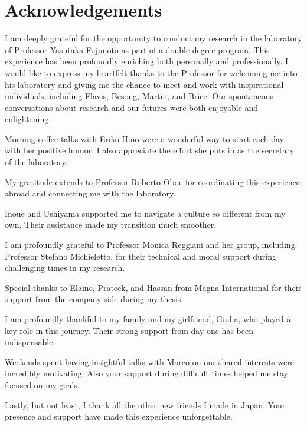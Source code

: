 \thispagestyle{empty}
\section*{Acknowledgements}
\vspace{0.5cm}
I am deeply grateful for the opportunity to conduct my research in the laboratory 
of Professor Yasutaka Fujimoto as part of a double-degree program. This experience 
has been profoundly enriching both personally and professionally. I would like 
to express my heartfelt thanks to the Professor for welcoming me into his laboratory and 
giving me the chance to meet and work with inspirational individuals, including 
Flavis, Besong, Martin, and Brice. Our spontaneous conversations about research 
and our futures were both enjoyable and enlightening.

Morning coffee talks with Eriko Hino were a wonderful way to start each day with 
her positive humor. I also appreciate the effort she puts in as the secretary of 
the laboratory.

My gratitude extends to Professor Roberto Oboe for coordinating this experience 
abroad and connecting me with the laboratory.

Inoue and Ushiyama supported me to navigate a culture so different 
from my own. Their assistance made my transition much smoother.

I am profoundly grateful to Professor Monica Reggiani and her group, including 
Professor Stefano Michieletto, for their technical and moral support during 
challenging times in my research.

Special thanks to Elaine, Prateek, and Hassan from Magna International for their 
support from the company side during my thesis.

I am profoundly thankful to my family and my girlfriend, Giulia, who played a 
key role in this journey. Their strong support from day one has been indispensable.

Weekends spent having insightful talks with Marco on our shared interests were 
incredibly motivating. Also your support during difficult times helped me stay 
focused on my goals.

Lastly, but not least, I thank all the other new friends I made in Japan. Your 
presence and support have made this experience unforgettable.
\afterpage{\blankpage}